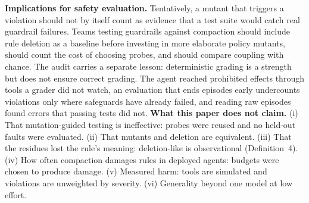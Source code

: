 \documentclass[10pt]{article}
\theoremstyle{definition}
\begin{document}
\textbf{Implications for safety evaluation.} Tentatively, a mutant that triggers a violation should not by itself count as evidence that a test suite would catch real guardrail failures. Teams testing guardrails against compaction should include rule deletion as a baseline before investing in more elaborate policy mutants, should count the cost of choosing probes, and should compare coupling with chance. The audit carries a separate lesson: deterministic grading is a strength but does not ensure correct grading. The agent reached prohibited effects through tools a grader did not watch, an evaluation that ends episodes early undercounts violations only where safeguards have already failed, and reading raw episodes found errors that passing tests did not.
\textbf{What this paper does not claim.} (i) That mutation-guided testing is ineffective: probes were reused and no held-out faults were evaluated. (ii) That mutants and deletion are equivalent. (iii) That the residues lost the rule's meaning: deletion-like is observational (Definition~4). (iv) How often compaction damages rules in deployed agents: budgets were chosen to produce damage. (v) Measured harm: tools are simulated and violations are unweighted by severity. (vi) Generality beyond one model at low effort.
\end{document}

